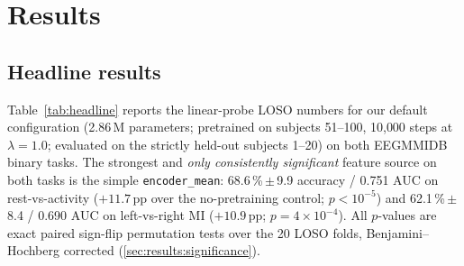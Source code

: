 \section{Results}
\label{sec:results}

\subsection{Headline results}
\label{sec:results:headline}

Table~\ref{tab:headline} reports the linear-probe LOSO numbers for our
default configuration (2.86\,M parameters; pretrained on subjects
51--100, 10{,}000 steps at $\lambda{=}1.0$; evaluated on the strictly
held-out subjects 1--20) on both EEGMMIDB binary tasks. The strongest and
\emph{only consistently significant} feature source on both tasks is the
simple \texttt{encoder\_mean}: 68.6\,\%\,$\pm$\,9.9 accuracy / 0.751 AUC on
rest-vs-activity ($+11.7$\,pp over the no-pretraining control;
$p{<}10^{-5}$) and 62.1\,\%\,$\pm$\,8.4 / 0.690 AUC on left-vs-right MI
($+10.9$\,pp; $p{=}4{\times}10^{-4}$). All $p$-values are exact paired
sign-flip permutation tests over the 20 LOSO folds, Benjamini--Hochberg
corrected (\cref{sec:results:significance}).

